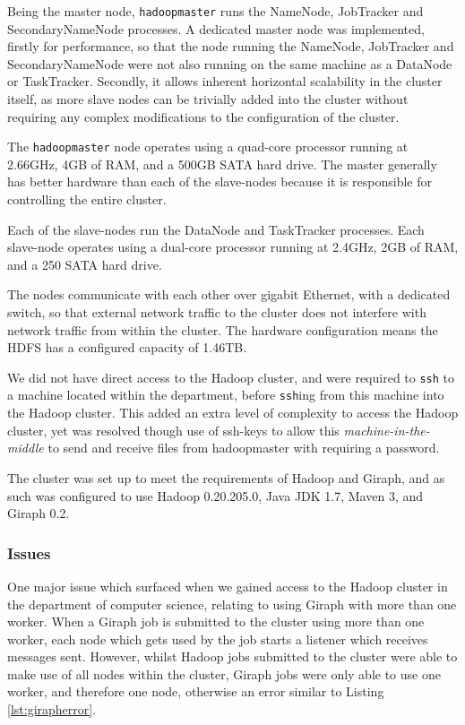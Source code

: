 Being the master node, {\tt hadoopmaster} runs the NameNode, JobTracker and SecondaryNameNode processes. A dedicated master node was implemented, firstly for performance, so that the node running the NameNode, JobTracker and SecondaryNameNode were not also running on the same machine as a DataNode or TaskTracker. Secondly, it allows inherent horizontal scalability in the cluster itself, as more slave nodes can be trivially added into the cluster without requiring any complex modifications to the configuration of the cluster. 

The {\tt hadoopmaster} node operates using a quad-core processor running at 2.66GHz, 4GB of RAM, and a 500GB SATA hard drive. The master generally has better hardware than each of the slave-nodes because it is responsible for controlling the entire cluster.

Each of the slave-nodes run the DataNode and TaskTracker processes. Each slave-node operates using a dual-core processor running at 2.4GHz, 2GB of RAM, and a 250 SATA hard drive.

The nodes communicate with each other over gigabit Ethernet, with a dedicated switch, so that external network traffic to the cluster does not interfere with network traffic from within the cluster. The hardware configuration means the HDFS has a configured capacity of 1.46TB.

We did not have direct access to the Hadoop cluster, and were required to {\tt ssh} to a machine located within the department, before {\tt ssh}ing from this machine into the Hadoop cluster. This added an extra level of complexity to access the Hadoop cluster, yet was resolved though use of ssh-keys to allow this \emph{machine-in-the-middle} to send and receive files from hadoopmaster with requiring a password.

The cluster was set up to meet the requirements of Hadoop and Giraph, and as such was configured to use Hadoop 0.20.205.0, Java JDK 1.7, Maven 3, and Giraph 0.2.

\subsubsection{Issues}
One major issue which surfaced when we gained access to the Hadoop cluster in the department of computer science, relating to using Giraph with more than one worker. When a Giraph job is submitted to the cluster using more than one worker, each node which gets used by the job starts a listener which receives messages sent. However, whilst Hadoop jobs submitted to the cluster were able to make use of all nodes within the cluster, Giraph jobs were only able to use one worker, and therefore one node, otherwise an error similar to Listing \ref{lst:girapherror}.

